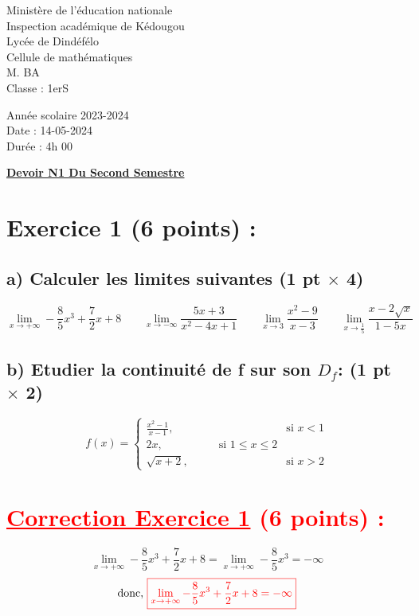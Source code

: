 \documentclass[12pt]{article}
\begin{document}
\begin{minipage}{0.5\textwidth}
	Ministère de l'éducation nationale  \\
	Inspection académique de Kédougou   \\
	Lycée de Dindéfélo            \\
	Cellule de mathématiques            \\
	M. BA                          \\
	Classe : 1erS  \\
\end{minipage}
\begin{minipage}{0.5\textwidth}
	Année scolaire 2023-2024 \\
	Date : 14-05-2024 \\
	Durée : 4h 00 \\
\end{minipage}

\begin{center}
	\textbf{{\underline{Devoir N1 Du Second Semestre}}}
\end{center}
\section*{Exercice 1 (6 points) :}
\subsection*{a) Calculer les limites suivantes (1 pt $\times$ 4)}
\[ \lim_{x \to +\infty}-\frac{8}{5}x^{3}+\frac{7}{2}x+8\quad\quad \lim_{x \to -\infty}\frac{5x+3}{x^{2}-4x+1}\quad\quad \lim_{x \to 3}\frac{x^{2}-9}{x-3}\quad\quad \lim_{x \to \frac{1}{5}}\frac{x-2\sqrt{x}}{1-5x} \]
\subsection*{b) Etudier la continuité de f sur son $D_{f}$: (1 pt $\times$ 2)}
\[ f(x) = \begin{cases} 
  \frac{x^2-1}{x-1}, & \text{si } x < 1 \\
   2x,\quad\quad\quad\quad\quad \text{si } 1 \leq x \leq 2\\
  \sqrt{x+2}, & \text{si } x > 2
\end{cases} \]
\section*{\textcolor{red}{\underline{Correction Exercice 1} (6 points) :}}
\[ \lim_{x \to +\infty}-\frac{8}{5}x^{3}+\frac{7}{2}x+8=\lim_{x \to +\infty}-\frac{8}{5}x^{3}=-\infty\]
\[\text{donc, }\textcolor{red}{\boxed{\lim_{x \to +\infty}-\frac{8}{5}x^{3}+\frac{7}{2}x+8=-\infty}}\]
\end{document}
